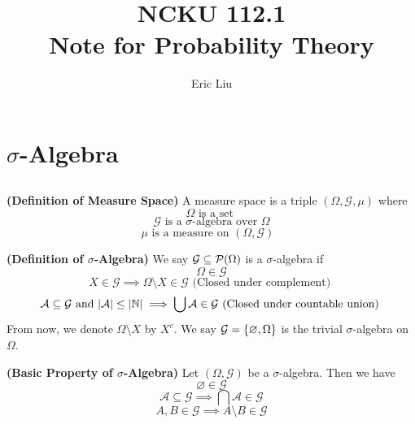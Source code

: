 \documentclass{report}
\title{\Huge{NCKU 112.1}\\Note for Probability Theory}
\author{\huge{Eric Liu}}
\date{}
\begin{document}
\maketitle
\newpage%
\tableofcontents
\pagebreak
\chapter{$\sigma$-Algebra}
\section{}
\begin{definition}
\label{1.1.1}
\textbf{(Definition of Measure Space)} A measure space is a triple $(\Omega,\mathcal{G},\mu)$ where
\begin{equation}
\Omega \text{ is a set }
\end{equation}
\begin{equation}
\mathcal{G}\text{ is a $\sigma$-algebra over $\Omega$}
\end{equation}
\begin{equation}
\mu\text{ is a measure on $(\Omega,\mathcal{G})$ }
\end{equation}
\end{definition}
\begin{definition}
\label{1.1.2}
\textbf{(Definition of $\sigma$-Algebra)} We say  $\mathcal{G}\subseteq\mathcal{P}(\Omega)$ is a $\sigma$-algebra if 
\begin{equation}
\Omega \in\mathcal{G} 
\end{equation}
\begin{equation}
X \in \mathcal{G}\implies \Omega \setminus X\in \mathcal{G} \text{ (Closed under complement) }
\end{equation}
\begin{equation}
\mathcal{A} \subseteq  \mathcal{G}\text{ and }|\mathcal{A}|\leq |\mathbb{N}|\implies \bigcup \mathcal{A}\in \mathcal{G}\text{ (Closed under countable union) }
\end{equation}
From now, we denote $\Omega\setminus X$ by $X^c$. We say $\mathcal{G}=\{ \varnothing,\Omega \}$ is the trivial $\sigma$-algebra on $\Omega$. 
\end{definition}
\begin{theorem}
\label{1.1.3}
\textbf{(Basic Property of $\sigma$-Algebra)} Let $(\Omega,\mathcal{G})$ be a $\sigma$-algebra. Then we have
\begin{equation}
\varnothing \in \mathcal{G}
\end{equation}
\begin{equation}
\mathcal{A}\subseteq \mathcal{G}\implies \bigcap \mathcal{A} \in \mathcal{G}
\end{equation}
\begin{equation}
A,B\in \mathcal{G}\implies A\setminus B \in \mathcal{G}
\end{equation}
\end{theorem}
\end{document}
